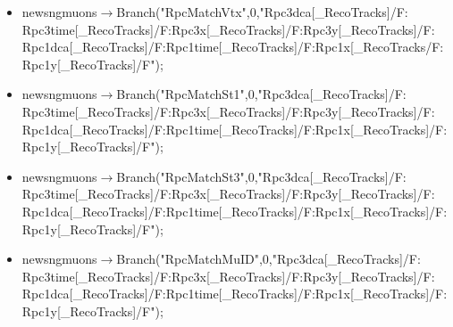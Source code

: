 \begin{itemize}
\item newsngmuons$\rightarrow$Branch("RpcMatchVtx",0,"Rpc3dca[\_RecoTracks]/F:\\Rpc3time[\_RecoTracks]/F:Rpc3x[\_RecoTracks]/F:Rpc3y[\_RecoTracks]/F:\\Rpc1dca[\_RecoTracks]/F:Rpc1time[\_RecoTracks]/F:Rpc1x[\_RecoTracks/F:\\Rpc1y[\_RecoTracks]/F");
\item newsngmuons$\rightarrow$Branch("RpcMatchSt1",0,"Rpc3dca[\_RecoTracks]/F:\\Rpc3time[\_RecoTracks]/F:Rpc3x[\_RecoTracks]/F:Rpc3y[\_RecoTracks]/F:\\Rpc1dca[\_RecoTracks]/F:Rpc1time[\_RecoTracks]/F:Rpc1x[\_RecoTracks]/F:\\Rpc1y[\_RecoTracks]/F");
\item newsngmuons$\rightarrow$Branch("RpcMatchSt3",0,"Rpc3dca[\_RecoTracks]/F:\\Rpc3time[\_RecoTracks]/F:Rpc3x[\_RecoTracks]/F:Rpc3y[\_RecoTracks]/F:\\Rpc1dca[\_RecoTracks]/F:Rpc1time[\_RecoTracks]/F:Rpc1x[\_RecoTracks]/F:\\Rpc1y[\_RecoTracks]/F");
\item newsngmuons$\rightarrow$Branch("RpcMatchMuID",0,"Rpc3dca[\_RecoTracks]/F:\\Rpc3time[\_RecoTracks]/F:Rpc3x[\_RecoTracks]/F:Rpc3y[\_RecoTracks]/F:\\Rpc1dca[\_RecoTracks]/F:Rpc1time[\_RecoTracks]/F:Rpc1x[\_RecoTracks]/F:\\Rpc1y[\_RecoTracks]/F");
\end{itemize}

